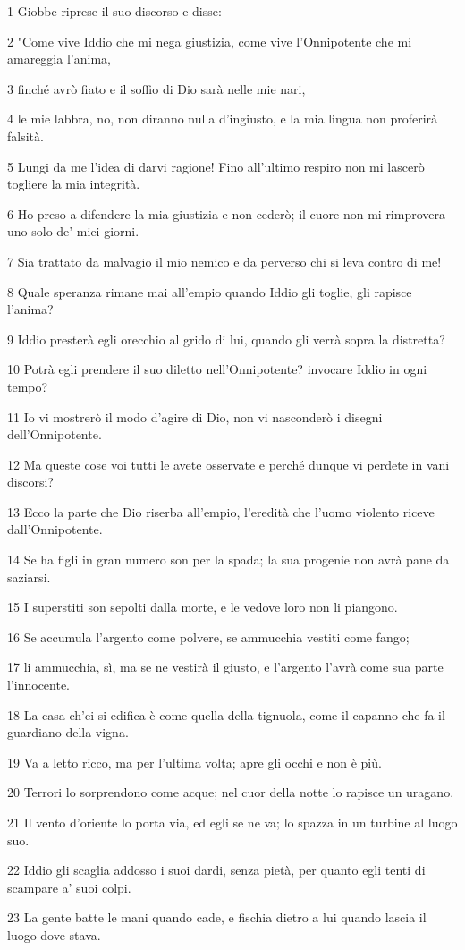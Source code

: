 \par 1 Giobbe riprese il suo discorso e disse:
\par 2 "Come vive Iddio che mi nega giustizia, come vive l'Onnipotente che mi amareggia l'anima,
\par 3 finché avrò fiato e il soffio di Dio sarà nelle mie nari,
\par 4 le mie labbra, no, non diranno nulla d'ingiusto, e la mia lingua non proferirà falsità.
\par 5 Lungi da me l'idea di darvi ragione! Fino all'ultimo respiro non mi lascerò togliere la mia integrità.
\par 6 Ho preso a difendere la mia giustizia e non cederò; il cuore non mi rimprovera uno solo de' miei giorni.
\par 7 Sia trattato da malvagio il mio nemico e da perverso chi si leva contro di me!
\par 8 Quale speranza rimane mai all'empio quando Iddio gli toglie, gli rapisce l'anima?
\par 9 Iddio presterà egli orecchio al grido di lui, quando gli verrà sopra la distretta?
\par 10 Potrà egli prendere il suo diletto nell'Onnipotente? invocare Iddio in ogni tempo?
\par 11 Io vi mostrerò il modo d'agire di Dio, non vi nasconderò i disegni dell'Onnipotente.
\par 12 Ma queste cose voi tutti le avete osservate e perché dunque vi perdete in vani discorsi?
\par 13 Ecco la parte che Dio riserba all'empio, l'eredità che l'uomo violento riceve dall'Onnipotente.
\par 14 Se ha figli in gran numero son per la spada; la sua progenie non avrà pane da saziarsi.
\par 15 I superstiti son sepolti dalla morte, e le vedove loro non li piangono.
\par 16 Se accumula l'argento come polvere, se ammucchia vestiti come fango;
\par 17 li ammucchia, sì, ma se ne vestirà il giusto, e l'argento l'avrà come sua parte l'innocente.
\par 18 La casa ch'ei si edifica è come quella della tignuola, come il capanno che fa il guardiano della vigna.
\par 19 Va a letto ricco, ma per l'ultima volta; apre gli occhi e non è più.
\par 20 Terrori lo sorprendono come acque; nel cuor della notte lo rapisce un uragano.
\par 21 Il vento d'oriente lo porta via, ed egli se ne va; lo spazza in un turbine al luogo suo.
\par 22 Iddio gli scaglia addosso i suoi dardi, senza pietà, per quanto egli tenti di scampare a' suoi colpi.
\par 23 La gente batte le mani quando cade, e fischia dietro a lui quando lascia il luogo dove stava.

